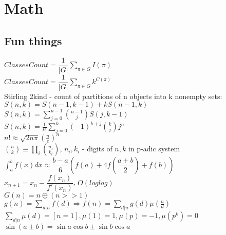 \chapter{Math}

{}
{}
{}
\columnbreak
\section{Fun things}
$ClassesCount = \dfrac{1}{|G|} \sum_{\pi \in G} I(\pi)$\\
$ClassesCount = \dfrac{1}{|G|} \sum_{\pi \in G} k^{C(\pi)}$\\
Stirling 2kind - count of partitions of n objects into k nonempty sets:\\
$S(n,k) = S(n-1,k-1) + kS(n-1,k)$\\
$S(n,k) = \sum_{j=0}^{n-1} \binom{n-1}{j}S(j,k-1)$\\
$S(n,k) = \frac{1}{k!}\sum_{j=0}^k(-1)^{k+j}\binom{k}{j}j^n$\\
$n! \approx \sqrt{2n\pi}(\frac{n}{e})^n$\\
$\binom{n}{k} \equiv \prod_{i}\binom{n_i}{k_i}$, $n_i, k_i$ - digits of $n,k$ in p-adic system
$\int_{a}^{b}f(x)dx \approx \dfrac{b-a}{6}(f(a) + 4f(\dfrac{a+b}
{2})+f(b))$\\
$x_{n+1} = x_n - \dfrac{f(x_n)}{f'(x_n)}$, $O(loglog)$\\
$G(n) = n \oplus (n >> 1)$\\
$g(n) = \sum_{d|n} f(d) \Rightarrow f(n) = \sum_{d|n} g(d) \mu(\frac{n}{d})$\\
$\sum_{d|n} \mu(d) = [n = 1],   \mu(1) = 1, \mu(p) = -1, \mu(p^k) = 0$\\
$\sin(a \pm b) = \sin a \cos b \pm \sin b \cos a$\\
